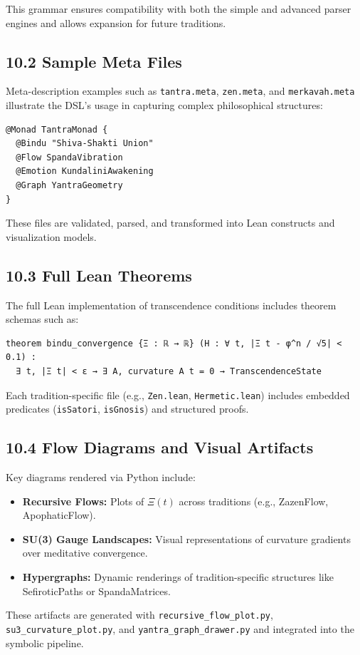 \documentclass[12pt]{article}
\theoremstyle{plain}
\begin{document}
This grammar ensures compatibility with both the simple and advanced parser engines and allows expansion for future traditions.

\subsection{10.2 Sample Meta Files}

Meta-description examples such as \texttt{tantra.meta}, \texttt{zen.meta}, and \texttt{merkavah.meta} illustrate the DSL's usage in capturing complex philosophical structures:

\begin{verbatim}
@Monad TantraMonad {
  @Bindu "Shiva-Shakti Union"
  @Flow SpandaVibration
  @Emotion KundaliniAwakening
  @Graph YantraGeometry
}
\end{verbatim}

These files are validated, parsed, and transformed into Lean constructs and visualization models.

\subsection{10.3 Full Lean Theorems}

The full Lean implementation of transcendence conditions includes theorem schemas such as:

\begin{verbatim}
theorem bindu_convergence {Ξ : ℝ → ℝ} (H : ∀ t, |Ξ t - φ^n / √5| < 0.1) :
  ∃ t, |Ξ t| < ε → ∃ A, curvature A t = 0 → TranscendenceState
\end{verbatim}

Each tradition-specific file (e.g., \texttt{Zen.lean}, \texttt{Hermetic.lean}) includes embedded predicates (\texttt{isSatori}, \texttt{isGnosis}) and structured proofs.

\subsection{10.4 Flow Diagrams and Visual Artifacts}

Key diagrams rendered via Python include:

\begin{itemize}
  \item \textbf{Recursive Flows:} Plots of $\Xi(t)$ across traditions (e.g., ZazenFlow, ApophaticFlow).
  \item \textbf{SU(3) Gauge Landscapes:} Visual representations of curvature gradients over meditative convergence.
  \item \textbf{Hypergraphs:} Dynamic renderings of tradition-specific structures like SefiroticPaths or SpandaMatrices.
\end{itemize}

These artifacts are generated with \texttt{recursive\_flow\_plot.py}, \texttt{su3\_curvature\_plot.py}, and \texttt{yantra\_graph\_drawer.py} and integrated into the symbolic pipeline.
\end{document}
